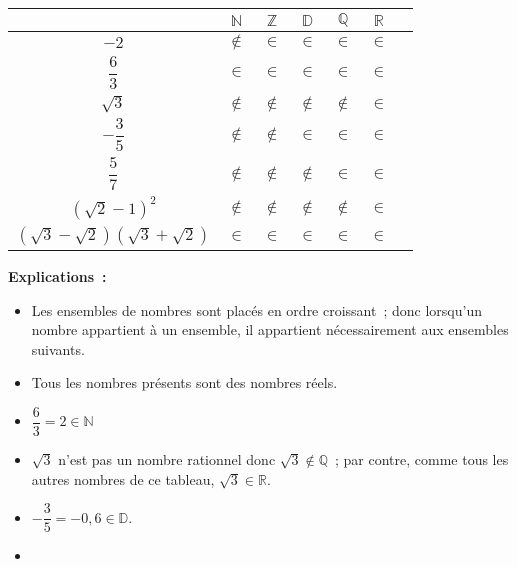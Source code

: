 \begin{corrige}
     \begin{center}
          \begin{tabular}{|c|c|c|c|c|c|c|} %
               \hline
               &  $\mathbb{N}$ &   $\mathbb{Z}$  &  $\mathbb{D}$  &  $\mathbb{Q}$  &  $\mathbb{R}$
               \\ \hline
               $-2$  &  $\notin$ & $\in$   & $\in$  & $\in$  &  $\in$
               \\ \hline
               $\dfrac{6}{3}$  & $\in$  & $\in$  &  $\in$ & $\in$  &  $\in$
               \\ \hline
               $ \sqrt{3}$  & $\notin$  & $\notin$  &  $\notin$ & $\notin$  &  $\in$
               \\ \hline
               $-\dfrac{3}{5}$  & $\notin$  & $\notin$  &  $\in$ & $\in$  &  $\in$
               \\ \hline
               $\dfrac{5}{7}$   & $\notin$  & $\notin$  &  $\notin$ & $\in$  &  $\in$
               \\ \hline
               $\left(\sqrt{2}-1\right)^2$   & $\notin$  & $\notin$  &  $\notin$ & $\notin$  &  $\in$
               \\ \hline
               $\left(\sqrt{3}-\sqrt{2}\right)\left(\sqrt{3}+\sqrt{2}\right)$  & $\in$  & $\in$  &  $\in$ & $\in$  &  $\in$
               \\ \hline
          \end{tabular}
     \end{center}
     \par
     \textbf{Explications~:}
     \par
     \begin{itemize}
          \item %
          Les ensembles de nombres sont placés en ordre croissant~; donc lorsqu'un nombre appartient à un ensemble, il appartient nécessairement aux ensembles suivants.
          \item %
          Tous les nombres présents sont des nombres réels.
          \item %
          $\dfrac{6}{3}=2 \in \mathbb{N}$
          \item %
          $ \sqrt{3}$ n'est pas un nombre rationnel donc  $ \sqrt{3} \notin \mathbb{Q}$~; par contre, comme tous les autres nombres de ce tableau,  $ \sqrt{3} \in \mathbb{R}.$
          \item %
          $ -\dfrac{3}{5}=-0,6 \in \mathbb{D}.$
          \item %

\end{itemize}
\end{corrige}
